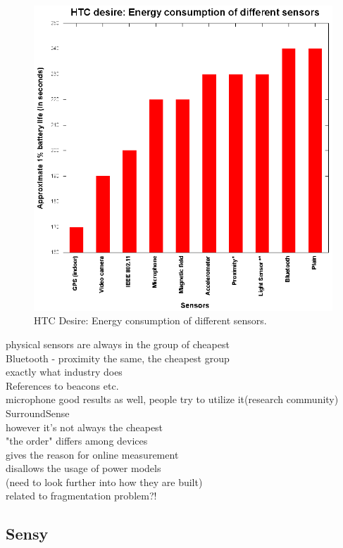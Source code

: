\begin{figure}[H]
\centering
\includegraphics[scale=1.5]{plots/htc_desire.eps}
\caption{HTC Desire: Energy  consumption of different sensors.}
\end{figure}

physical sensors are always in the group of cheapest \\

Bluetooth - proximity the same, the cheapest group\\
				exactly what industry does\\
				References to beacons etc.\\

microphone good results as well, people try to utilize it(research community)\\
				SurroundSense \cite{azizyan:surroundsense}\\
				however it's not always the cheapest\\
				
				
"the order" differs among devices\\
	gives the reason for online measurement\\
	disallows the usage of power models\\
		(need to look further into how they are built)\\
	related to fragmentation problem?!\\
								
\subsection{Sensy}